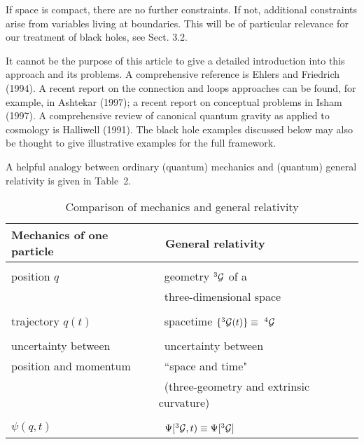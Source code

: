 \documentclass[12pt]{article}
\begin{document}
If space is compact, there are no further
constraints. If not, additional constraints arise from variables
living at boundaries. This will be of particular relevance for
our treatment of black holes, see Sect. 3.2.

It cannot be the purpose of this article to give a detailed introduction
into this approach and its problems. A comprehensive reference is
Ehlers and Friedrich (1994). A recent report on the connection
and loops approaches can be found, for example, in Ashtekar (1997);
a recent report on conceptual problems in Isham (1997). 
A comprehensive review of canonical quantum gravity as applied to
cosmology is Halliwell (1991). The black hole examples discussed
below may also be thought to give illustrative examples
for the full framework.
 
A helpful analogy between ordinary (quantum) mechanics and
(quantum) general relativity is given in Table~2.

\begin{table}[htb]
\caption[ ]{Comparison of mechanics and general relativity}
\begin{flushleft}
\renewcommand{\arraystretch}{1.2}  
\begin{tabular}{l|l}
{Mechanics of one particle} &\ {General relativity} \\ \hline
{} & {} \\
position $q$ &\  geometry $^3{\cal G}$ of a  \\
{}  & \ three-dimensional space\\
{} & {} \\
trajectory $q(t)$ &\ spacetime $\{^3{\cal G}(t)\}\equiv\ ^4{\cal G}$ \\
{} & {} \\
uncertainty between &\ uncertainty between\\
position and momentum &\ ``space and time"\\
{} & \ (three-geometry and extrinsic curvature)\\
{} & {} \\
$\psi(q,t)$ &\ $\Psi[^3{\cal G},t)\equiv \Psi[^3{\cal G}]$ \\
\end{tabular}
\renewcommand{\arraystretch}{1}
\end{flushleft}\end{table}
\end{document}
